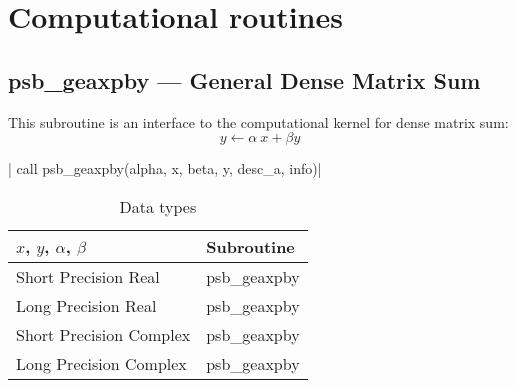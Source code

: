 \section{Computational routines}

%
%
\clearpage\subsection{psb\_geaxpby --- General Dense Matrix Sum}

This subroutine is an interface to the computational kernel for
dense matrix sum:
\[ y \leftarrow  \alpha\> x+ \beta y \]

\fortinline| call psb_geaxpby(alpha, x, beta, y, desc_a, info)|

\begin{table}[h]
\begin{center}
\begin{tabular}{ll}
\hline
$x$, $y$, $\alpha$, $\beta$ & {\bf Subroutine}\\
\hline
Short Precision Real & psb\_geaxpby \\
Long Precision Real & psb\_geaxpby \\
Short Precision Complex & psb\_geaxpby \\
Long Precision Complex & psb\_geaxpby \\
\hline
\end{tabular}
\end{center}
\caption{Data types\label{tab:f90axpby}}
\end{table}

